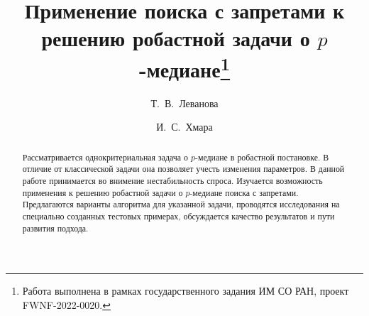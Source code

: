 \usepackage[russian]{nla}


\fi

\title{Применение поиска с запретами к решению робастной задачи о $p$-медиане\thanks{Работа выполнена в рамках государственного задания ИМ СО РАН, проект \textnumero~ FWNF-2022-0020.}}
\author{Т.~В.~Леванова  \and    И.~С.~Хмара
}


\maketitle

\begin{abstract}
Рассматривается однокритериальная задача о $p$-медиане в робастной постановке. В отличие от классической задачи она позволяет учесть изменения параметров. В данной работе  принимается  во внимение нестабильность  спроса. Изучается возможность применения к  решению робастной задачи о $p$-медиане поиска с запретами. Предлагаются варианты алгоритма для указанной задачи, проводятся исследования на специально созданных тестовых примерах, обсуждается качество результатов и пути развития подхода.

\end{abstract}


